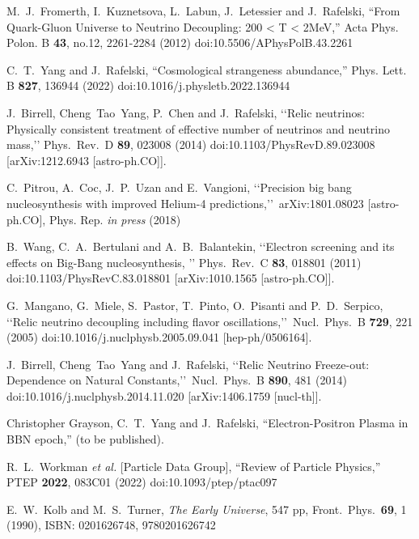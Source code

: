 \documentclass[Universe,article,submit,moreauthors,pdftex]{Definitions/mdpi}
\begin{document}
\begin{thebibliography}{99}

M.~J.~Fromerth, I.~Kuznetsova, L.~Labun, J.~Letessier and J.~Rafelski,
``From Quark-Gluon Universe to Neutrino Decoupling: 200 < T < 2MeV,''
Acta Phys. Polon. B \textbf{43}, no.12, 2261-2284 (2012)
doi:10.5506/APhysPolB.43.2261

C.~T.~Yang and J.~Rafelski,
``Cosmological strangeness abundance,''
Phys. Lett. B \textbf{827}, 136944 (2022)
doi:10.1016/j.physletb.2022.136944

J.~Birrell, Cheng~Tao~Yang, P.~Chen and J.~Rafelski,
\lq\lq Relic neutrinos: Physically consistent treatment of effective number of neutrinos and neutrino mass,\rq\rq
Phys.\ Rev.\ D {\bf 89}, 023008 (2014)
doi:10.1103/PhysRevD.89.023008
[arXiv:1212.6943 [astro-ph.CO]].

C.~Pitrou, A.~Coc, J.~P.~Uzan and E.~Vangioni,
\lq\lq Precision big bang nucleosynthesis with improved Helium-4 predictions,\rq\rq\ 
arXiv:1801.08023 [astro-ph.CO], Phys. Rep. {\it in press} (2018)

B.~Wang, C.~A.~Bertulani and A.~B.~Balantekin,
\lq\lq Electron screening and its effects on Big-Bang nucleosynthesis, \rq\rq
Phys.\ Rev.\ C {\bf 83}, 018801 (2011)
doi:10.1103/PhysRevC.83.018801
[arXiv:1010.1565 [astro-ph.CO]].

G.~Mangano, G.~Miele, S.~Pastor, T.~Pinto, O.~Pisanti and P.~D.~Serpico,
\lq\lq Relic neutrino decoupling including flavor oscillations,\rq\rq\
Nucl.\ Phys.\ B {\bf 729}, 221 (2005)
doi:10.1016/j.nuclphysb.2005.09.041
[hep-ph/0506164].

 J.~Birrell, Cheng~Tao~Yang and J.~Rafelski,
\lq\lq Relic Neutrino Freeze-out: Dependence on Natural Constants,\rq\rq\
 Nucl.\ Phys.\ B {\bf 890}, 481 (2014)
 doi:10.1016/j.nuclphysb.2014.11.020
 [arXiv:1406.1759 [nucl-th]].

\bibitem{Chris:2023abc}
Christopher Grayson, C.~T.~Yang and J.~Rafelski,
``Electron-Positron Plasma in BBN epoch,'' (to be published).

\bibitem{ParticleDataGroup:2022pth}
R.~L.~Workman \textit{et al.} [Particle Data Group],
``Review of Particle Physics,''
PTEP \textbf{2022}, 083C01 (2022)
doi:10.1093/ptep/ptac097

E.~W.~Kolb and M.~S.~Turner,
\emph{The Early Universe},
547 pp, Front.\ Phys.\ {\bf 69}, 1 (1990),
ISBN: 0201626748, 9780201626742


 


\end{thebibliography}

\end{document}
